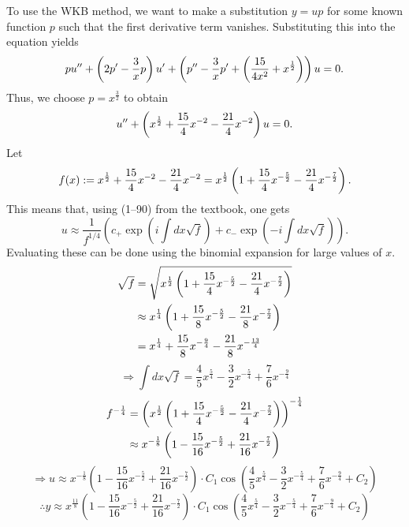\item
To use the WKB method, we want to make a substitution $y = up$ for some known function $p$ such that the first derivative term vanishes.
Substituting this into the equation yields
\[
	pu'' + \left( 2p' - \frac{3}{x}p \right)u' + \left( p'' - \frac{3}{x}p' + \left( \frac{15}{4x^2} + x^{\frac{1}{2}} \right) \right)u = 0.
\]
Thus, we choose $p = x^{\frac{3}{2}}$ to obtain
\[
	u'' + \left( x^{\frac{1}{2}} + \frac{15}{4}x^{-2} - \frac{21}{4}x^{-2} \right) u = 0.
\]
Let
\[
	f(x) := x^{\frac{1}{2}} + \frac{15}{4}x^{-2} - \frac{21}{4}x^{-2} = x^{\frac{1}{2}} \left( 1 + \frac{15}{4}x^{-\frac{5}{2}} - \frac{21}{4}x^{-\frac{7}{2}} \right).
\]
This means that, using  (1--90) from the textbook, one gets
\[
	u \approx \frac{1}{f^{1/4}} \left( c_+ \exp\left( i\int dx \sqrt{f} \right) + c_- \exp\left( -i\int dx \sqrt{f} \right) \right).
\]
Evaluating these can be done using the binomial expansion for large values of $x$.
\begin{align*}
	\sqrt{f}
	 & = \sqrt{x^{\frac{1}{2}} \left( 1 + \frac{15}{4}x^{-\frac{5}{2}} - \frac{21}{4}x^{-\frac{7}{2}} \right)}        \\
	 & \approx x^{\frac{1}{4}} \left( 1 + \frac{15}{8}x^{-\frac{5}{2}} - \frac{21}{8}x^{-\frac{7}{2}} \right) \\
	 & = x^{\frac{1}{4}} + \frac{15}{8}x^{-\frac{9}{4}} - \frac{21}{8}x^{-\frac{13}{4}}
\end{align*}
\[
	\Rightarrow \int dx \sqrt{f}
	= \frac{4}{5}x^{\frac{5}{4}} - \frac{3}{2} x^{-\frac{5}{4}} + \frac{7}{6}x^{-\frac{9}{4}}
\]
\begin{align*}
	f^{-\frac{1}{4}}
	 & = {\left( x^{\frac{1}{2}} \left( 1 + \frac{15}{4}x^{-\frac{5}{2}} - \frac{21}{4}x^{-\frac{7}{2}} \right) \right)}^{-\frac{1}{4}} \\
	 & \approx x^{-\frac{1}{8}} \left( 1 - \frac{15}{16}x^{-\frac{5}{2}} + \frac{21}{16}x^{-\frac{7}{2}} \right)
\end{align*}
\[
	\Rightarrow u
	\approx x^{-\frac{1}{8}} \left( 1 - \frac{15}{16}x^{-\frac{5}{2}} + \frac{21}{16}x^{-\frac{7}{2}} \right)
	\cdot C_1 \cos\left( \frac{4}{5}x^{\frac{5}{4}} - \frac{3}{2} x^{-\frac{5}{4}} + \frac{7}{6}x^{-\frac{9}{4}} + C_2 \right)
\]
\[
	\therefore y
	\approx x^{\frac{11}{8}} \left( 1 - \frac{15}{16}x^{-\frac{5}{2}} + \frac{21}{16}x^{-\frac{7}{2}} \right)
	\cdot C_1 \cos\left( \frac{4}{5}x^{\frac{5}{4}} - \frac{3}{2} x^{-\frac{5}{4}} + \frac{7}{6}x^{-\frac{9}{4}} + C_2 \right)
\]